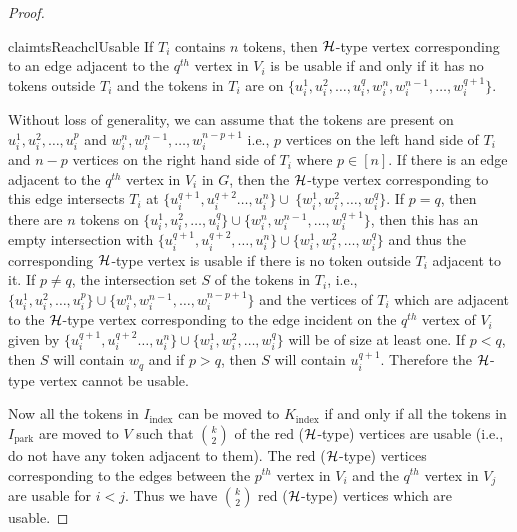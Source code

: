 \begin{proof}
\begin{restatable}{claim}{tsReachclUsable}
\label{cl:usable}
If $T_i$ contains $n$ tokens, then ${\mathcal H}$-type vertex corresponding to an edge adjacent to the $q^{th}$ vertex in $V_i$ is be usable if and only 
if it has no tokens outside $T_i$ and the tokens in $T_i$ are on 
$\{u_i^1,u_i^2,\ldots,u_i^q,w_i^n,w_i^{n-1},\ldots,w_i^{q+1}\}$.
\end{restatable}
\begin{claimproof}
Without loss of generality, we can assume that the tokens are present on
$u_i^1,u_i^2,\ldots,u_i^p$ and $w_i^n,w_i^{n-1},\ldots,w_i^{n-p+1}$
i.e., $p$ vertices on the left hand side of $T_i$ and $n-p$ vertices on the
right hand side of $T_i$ where $p\in [n]$.
If there is an edge adjacent to the $q^{th}$ vertex in $V_i$ in $G$,
then the ${\mathcal H}$-type vertex corresponding to this edge
intersects $T_i$ at $\{u_i^{q+1},u_i^{q+2} \ldots,u_i^n\} \cup \
\{w_i^1,w_i^2,\ldots,w_i^q\}$.
If $p=q$, then there are $n$ tokens on
$\{u_i^1,u_i^2,\ldots,u_i^q\} \cup
\{w_i^n,w_i^{n-1},\ldots,w_i^{q+1}\}$,
then this has an empty intersection with
$\{u_i^{q+1},u_i^{q+2},\ldots,u_i^n\} \cup \{w_i^1,w_i^2,\ldots,w_i^q\}$
and thus the corresponding ${\mathcal H}$-type vertex is usable
if there is no token outside $T_i$ adjacent to it.
If $p\neq q$, the intersection set $S$ of the tokens in $T_i$, i.e.,
$\{u_i^1,u_i^2,\ldots,u_i^p\} \cup
\{w_i^n,w_i^{n-1},\ldots,w_i^{n-p+1}\}$
and the vertices of $T_i$ which are adjacent to the ${\mathcal H}$-type
vertex corresponding to the edge incident on the $q^{th}$ vertex
of $V_i$ given by
$\{u_i^{q+1},u_i^{q+2} \ldots,u_i^n\} \cup \{w_i^1,w_i^2,\ldots,w_i^q\}$
will be of size at least one.
If $p<q$, then $S$ will contain $w_q$ and if $p>q$,
then $S$ will contain $u_i^{q+1}$.
Therefore the ${\mathcal H}$-type vertex cannot be usable.
\end{claimproof}

\noindent Now all the tokens in $I_{\text{index}}$ can be moved to
$K_{\text{index}}$ if and only if all the tokens in
$I_{\text{park}}$ are moved to $V$ such that
${k}\choose{2}$ of the red (${\mathcal H}$-type) vertices are usable
(i.e., do not have any token adjacent to them).
The red (${\mathcal H}$-type) vertices corresponding to the edges between the 
$p^{th}$ vertex in $V_i$ and the $q^{th}$ vertex in $V_j$ are usable 
for $i<j$. 
Thus we have ${k}\choose{2}$ red (${\mathcal H}$-type) vertices which are usable.



\end{proof}
